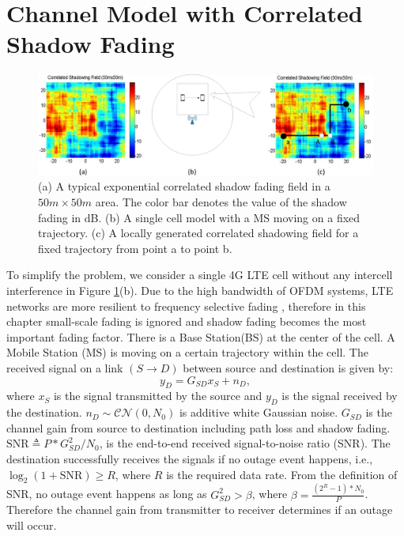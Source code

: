 \section{Channel Model with Correlated Shadow Fading}
\label{sec:shadowing}
\begin{figure}
\centering
\includegraphics[width=14cm]{finalsystemab_V3.eps}
\caption{(a) A typical exponential correlated shadow fading field in a $50m\times50m$ area. The color bar denotes the value of the shadow fading in dB. (b) A single cell model with a MS moving on a fixed trajectory. (c) A locally generated correlated shadowing field for a fixed trajectory from point a to point b.}
\label{systemmodel}
\end{figure}
To simplify the problem, we consider a single 4G LTE cell without any intercell interference in Figure \ref{systemmodel}(b). Due to the high bandwidth of OFDM systems,  LTE networks are more resilient to frequency selective fading \cite{rappaport1996wireless}, therefore in this chapter small-scale fading is ignored and shadow fading becomes the most important fading factor. There is a Base Station(BS) at the center of the cell. A Mobile Station (MS) is moving on a certain trajectory within the cell. The received signal on a link $(S\to D)$ between source and destination is given by:
\begin{equation}
y_{D} = G_{SD}x_{S}+n_{D},
\end{equation}
where $x_{S}$ is the signal transmitted by the source and $y_{D}$ is the signal received by the destination. $n_{D}\sim \mathcal{CN}(0,N_{0})$ is additive white Gaussian noise. $G_{SD}$ is the channel gain from source to destination including path loss and shadow fading.  $\text{SNR} \triangleq P*G_{SD}^{2}/N_{0}$, is the end-to-end received signal-to-noise ratio (SNR). The destination successfully receives the signals if no outage event happens, i.e., $\log_{2}(1+\text{SNR})\ge R$, where $R$ is the required data rate. From the definition of SNR, no outage event happens as long as $G_{SD}^2 > \beta$, where $\beta = \frac{(2^{R}-1)*N_{0}}{P}$. Therefore the channel gain from transmitter to receiver determines if an outage will occur.
